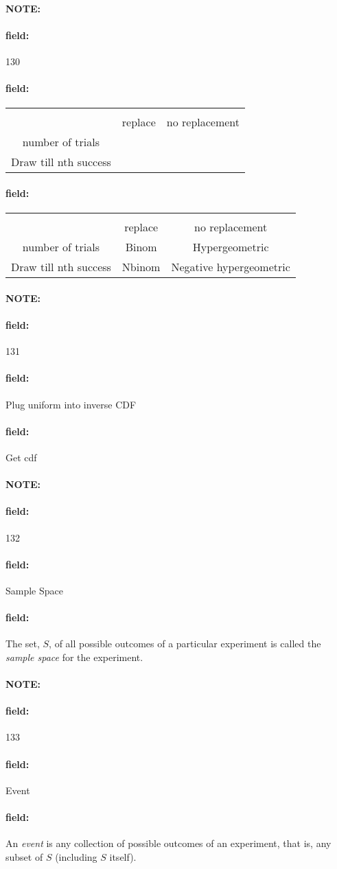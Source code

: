 \documentclass[12pt]{article}
\newenvironment{note}{\paragraph{NOTE:}}{}
\newenvironment{field}{\paragraph{field:}}{}
\begin{document}
\begin{note} \begin{field} \tiny 130 \end{field}
  \begin{field}
    \begin{tabular}{|c| c c |}
    \hline \\
    & replace & no replacement \\
    number of trials &  &  \\
    Draw till nth success & & \\
    \hline
    \end{tabular}
  \end{field}
  \begin{field}
    \begin{tabular}{|c| c c |}
    \hline \\
    & replace & no replacement \\
    number of trials & Binom & Hypergeometric \\
    Draw till nth success & Nbinom & Negative hypergeometric \\
    \hline
    \end{tabular}
  \end{field}
\end{note}

\begin{note} \begin{field} \tiny 131 \end{field}
  \begin{field}
    Plug uniform into inverse CDF
  \end{field}
  \begin{field}
    Get cdf
  \end{field}
\end{note}

\begin{note} \begin{field} \tiny 132 \end{field}
  \begin{field}
    Sample Space
  \end{field}
  \begin{field}
    The set, $S$, of all possible outcomes of a particular experiment is called the \textit{sample space} for the experiment.
  \end{field}
\end{note}

\begin{note} \begin{field} \tiny 133 \end{field}
  \begin{field}
    Event
  \end{field}
  \begin{field}
    An \textit{event} is any collection of possible outcomes of an experiment, that is, any subset of $S$ (including $S$ itself).
  \end{field}
\end{note}
\end{document}

